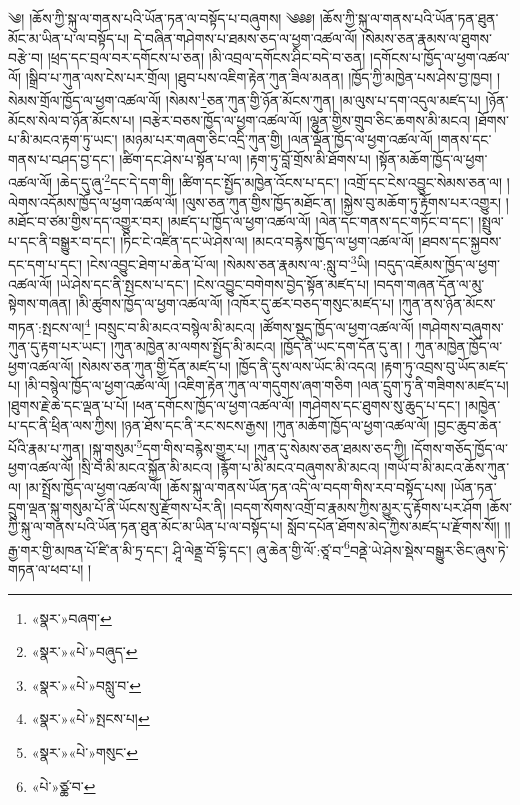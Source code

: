 ༄། །ཆོས་ཀྱི་སྐུ་ལ་གནས་པའི་ཡོན་ཏན་ལ་བསྟོད་པ་བཞུགས། ༄༅༅། །ཆོས་ཀྱི་སྐུ་ལ་གནས་པའི་ཡོན་ཏན་ཐུན་མོང་མ་ཡིན་པ་ལ་བསྟོད་པ། དེ་བཞིན་གཤེགས་པ་ཐམས་ཅད་ལ་ཕྱག་འཚལ་ལོ། །སེམས་ཅན་རྣམས་ལ་ཐུགས་བརྩེ་བ། །ཕྲད་དང་བྲལ་བར་དགོངས་པ་ཅན། །མི་འབྲལ་དགོངས་ཤིང་བདེ་བ་ཅན། །དགོངས་པ་ཁྱོད་ལ་ཕྱག་འཚལ་ལོ། །སྒྲིབ་པ་ཀུན་ལས་ངེས་པར་གྲོལ། །ཐུབ་པས་འཇིག་རྟེན་ཀུན་ཟིལ་མནན། །ཁྱོད་ཀྱི་མཁྱེན་པས་ཤེས་བྱ་ཁྱབ། །སེམས་གྲོལ་ཁྱོད་ལ་ཕྱག་འཚལ་ལོ། །སེམས་\footnote{«སྣར་»བཞག་}ཅན་ཀུན་གྱི་ཉོན་མོངས་ཀུན། །མ་ལུས་པ་དག་འདུལ་མཛད་པ། །ཉོན་མོངས་སེལ་བ་ཉོན་མོངས་པ། །བརྩེར་བཅས་ཁྱོད་ལ་ཕྱག་འཚལ་ལོ། །ལྷུན་གྱིས་གྲུབ་ཅིང་ཆགས་མི་མངའ། །ཐོགས་པ་མི་མངའ་རྟག་ཏུ་ཡང་། །མཉམ་པར་གཞག་ཅིང་འདྲི་ཀུན་གྱི། །ལན་ལྡོན་ཁྱོད་ལ་ཕྱག་འཚལ་ལོ། །གནས་དང་གནས་པ་བཤད་བྱ་དང་། །ཚིག་དང་ཤེས་པ་སྟོན་པ་ལ། །རྟག་ཏུ་བློ་གྲོས་མི་ཐོགས་པ། །སྟོན་མཆོག་ཁྱོད་ལ་ཕྱག་འཚལ་ལོ། །ཆེད་དུ་ཞུ་\footnote{«སྣར་»«པེ་»བཞུད་}དང་དེ་དག་གི། །ཚིག་དང་སྤྱོད་མཁྱེན་འོངས་པ་དང་། །འགྲོ་དང་ངེས་འབྱུང་སེམས་ཅན་ལ། །ལེགས་འདོམས་ཁྱོད་ལ་ཕྱག་འཚལ་ལོ། །ལུས་ཅན་ཀུན་གྱིས་ཁྱོད་མཐོང་ན། །སྐྱེས་བུ་མཆོག་ཏུ་རྟོགས་པར་འགྱུར། །མཐོང་བ་ཙམ་གྱིས་དད་འགྱུར་བར། །མཛད་པ་ཁྱོད་ལ་ཕྱག་འཚལ་ལོ། །ལེན་དང་གནས་དང་གཏོང་བ་དང་། །སྤྲུལ་པ་དང་ནི་བསྒྱུར་བ་དང་། །ཏིང་ངེ་འཛིན་དང་ཡེ་ཤེས་ལ། །མངའ་བརྙེས་ཁྱོད་ལ་ཕྱག་འཚལ་ལོ། །ཐབས་དང་སྐྱབས་དང་དག་པ་དང་། །ངེས་འབྱུང་ཐེག་པ་ཆེན་པོ་ལ། །སེམས་ཅན་རྣམས་ལ་:སླུ་བ་\footnote{«སྣར་»«པེ་»བསླུ་བ་}ཡི། །བདུད་འཇོམས་ཁྱོད་ལ་ཕྱག་འཚལ་ལོ། །ཡེ་ཤེས་དང་ནི་སྤངས་པ་དང་། །ངེས་འབྱུང་བགེགས་བྱེད་སྟོན་མཛད་པ། །བདག་གཞན་དོན་ལ་མུ་སྟེགས་གཞན། །མི་ཚུགས་ཁྱོད་ལ་ཕྱག་འཚལ་ལོ། །འཁོར་དུ་ཚར་བཅད་གསུང་མཛད་པ། །ཀུན་ནས་ཉོན་མོངས་གཏན་:སྤངས་ལ།\footnote{«སྣར་»«པེ་»སྤངས་པ།} །བསྲུང་བ་མི་མངའ་བསྙེལ་མི་མངའ། །ཚོགས་སྡུད་ཁྱོད་ལ་ཕྱག་འཚལ་ལོ། །གཤེགས་བཞུགས་ཀུན་དུ་རྟག་པར་ཡང་། །ཀུན་མཁྱེན་མ་ལགས་སྤྱོད་མི་མངའ། །ཁྱོད་ནི་ཡང་དག་དོན་དུ་ན། །
ཀུན་མཁྱེན་ཁྱོད་ལ་ཕྱག་འཚལ་ལོ། །སེམས་ཅན་ཀུན་གྱི་དོན་མཛད་པ། །ཁྱོད་ནི་དུས་ལས་ཡོང་མི་འདའ། །རྟག་ཏུ་འབྲས་བུ་ཡོད་མཛད་པ། །མི་བསྙེལ་ཁྱོད་ལ་ཕྱག་འཚལ་ལོ། །འཇིག་རྟེན་ཀུན་ལ་གདུགས་ཞག་གཅིག །ལན་དྲུག་ཏུ་ནི་གཟིགས་མཛད་པ། །ཐུགས་རྗེ་ཆེ་དང་ལྡན་པ་པོ། །ཕན་དགོངས་ཁྱོད་ལ་ཕྱག་འཚལ་ལོ། །གཤེགས་དང་ཐུགས་སུ་ཆུད་པ་དང་། །མཁྱེན་པ་དང་ནི་ཕྲིན་ལས་ཀྱིས། །ཉན་ཐོས་དང་ནི་རང་སངས་རྒྱས། །ཀུན་མཆོག་ཁྱོད་ལ་ཕྱག་འཚལ་ལོ། །བྱང་ཆུབ་ཆེན་པོའི་རྣམ་པ་ཀུན། །སྐུ་གསུམ་\footnote{«སྣར་»«པེ་»གསུང་}དག་གིས་བརྙེས་གྱུར་པ། །ཀུན་དུ་སེམས་ཅན་ཐམས་ཅད་ཀྱི། །དོགས་གཅོད་ཁྱོད་ལ་ཕྱག་འཚལ་ལོ། །སྲི་བ་མི་མངའ་སྐྱོན་མི་མངའ། །རྙོག་པ་མི་མངའ་བཞུགས་མི་མངའ། །གཡོ་བ་མི་མངའ་ཆོས་ཀུན་ལ། །མ་སྤྲོས་ཁྱོད་ལ་ཕྱག་འཚལ་ལོ། །ཆོས་སྐུ་ལ་གནས་ཡོན་ཏན་འདི་ལ་བདག་གིས་རབ་བསྟོད་པས། །ཡོན་ཏན་དྲུག་ལྡན་སྐུ་གསུམ་པོ་ནི་ཡོངས་སུ་རྫོགས་པར་ནི། །བདག་སོགས་འགྲོ་བ་རྣམས་ཀྱིས་མྱུར་དུ་རྟོགས་པར་ཤོག །ཆོས་ཀྱི་སྐུ་ལ་གནས་པའི་ཡོན་ཏན་ཐུན་མོང་མ་ཡིན་པ་ལ་བསྟོད་པ། སློབ་དཔོན་ཐོགས་མེད་ཀྱིས་མཛད་པ་རྫོགས་སོ།། །།རྒྱ་གར་གྱི་མཁན་པོ་ཛི་ན་མི་ཏྲ་དང་། ཤཱི་ལེནྡྲ་བོ་དྷི་དང་། ཞུ་ཆེན་གྱི་ལོ་:ཙཱ་བ་\footnote{«པེ་»ཙྪ་བ་}བནྡེ་ཡེ་ཤེས་སྡེས་བསྒྱུར་ཅིང་ཞུས་ཏེ་གཏན་ལ་ཕབ་པ། ། 